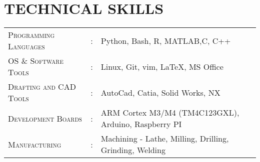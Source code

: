 \documentclass[letterpaper,11pt]{article}
\begin{document}
\section{TECHNICAL SKILLS}
\begin{tabular}{l c l}
	\textsc{Programming Languages}&:& Python, Bash, R, MATLAB,C, C++ \\
	\textsc{OS \& Software Tools}&:& Linux, Git, vim, \LaTeX, MS Office\\
    \textsc{Drafting and CAD Tools}&:& AutoCad, Catia, Solid Works, NX\\
    \textsc{Development Boards}&:& ARM Cortex M3/M4 (TM4C123GXL), Arduino, Raspberry PI\\
	\textsc{Manufacturing}&:& Machining - Lathe, Milling, Drilling, Grinding,
	Welding\\
\end{tabular}
\end{document}
